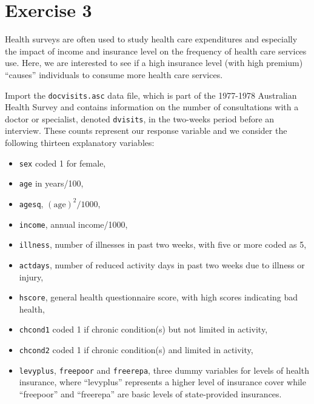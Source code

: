 \documentclass[a4paper,12pt]{article}
\begin{document}

\section{Exercise 3}

Health surveys are often used to study health care expenditures and especially the impact of income and insurance level on the frequency of health care services use. Here, we are interested to see if a high insurance level (with high premium) ``causes'' individuals to consume more health care services.

Import the \verb"docvisits.asc" data file, which is part of the 1977-1978 Australian Health Survey and contains information on the number of consultations with a doctor or specialist, denoted \texttt{dvisits}, in the two-weeks period before an interview. These counts represent our response variable and we consider the following thirteen explanatory variables:
\begin{itemize}
\item{\texttt{sex} coded 1 for female,}
\item{\texttt{age} in years/100,}
\item{\texttt{agesq}, $(\text{age})^2/1000$,}
\item{\texttt{income}, annual income/1000,}
\item{\texttt{illness}, number of illnesses in past two weeks, with five or more coded as 5,}
\item{\texttt{actdays}, number of reduced activity days in past two weeks due to illness or injury,}
\item{\texttt{hscore}, general health questionnaire score, with high scores indicating bad health,}
\item{\texttt{chcond1} coded 1 if chronic condition(s) but not limited in activity,}
\item{\texttt{chcond2} coded 1 if chronic condition(s) and limited in activity,}
\item{\texttt{levyplus}, \texttt{freepoor} and \texttt{freerepa}, three dummy variables for levels of health insurance, where ``levyplus''
represents a higher level of insurance cover while ``freepoor'' and ``freerepa'' are basic levels of state-provided insurances.}
\end{itemize}
\end{document}
